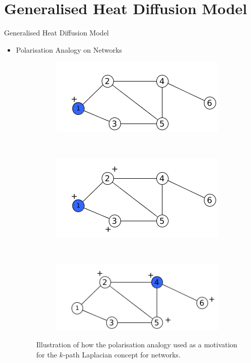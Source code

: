 \documentclass{beamer}
\begin{document}
\section{Generalised Heat Diffusion Model}
\begin{frame}{Generalised Heat Diffusion Model}
\begin{itemize}
	\item Polarisation Analogy on Networks
	 \begin{figure}[!h]
		\centering
		\begin{subfigure}[b]{0.3\textwidth}
			\includegraphics[width=\textwidth]{images/nodecharge1.png}
			\caption{}
			\label{particle1}
		\end{subfigure}~
		\begin{subfigure}[b]{0.3\textwidth}
			\includegraphics[width=\textwidth]{images/nodecharge11.png}
			\caption{}
			\label{polarity2}
		\end{subfigure}~ 
		\begin{subfigure}[b]{0.3\textwidth}
			\includegraphics[width=\textwidth]{images/nodecharge2.png}
			\caption{}
			\label{polarity3}
		\end{subfigure}
		\caption{ Illustration of how the polarisation analogy used as a motivation for the $k$-path Laplacian concept for networks. }
	\end{figure}
\end{itemize}
\end{frame}
\end{document}
